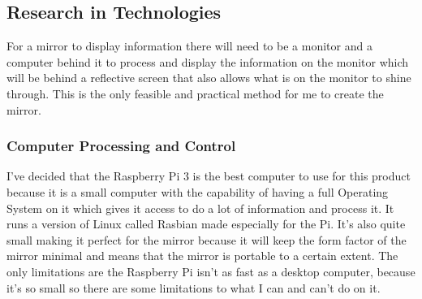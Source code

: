 \documentclass[12pt]{article}
\begin{document}
    \subsection{Research in Technologies}
        For a mirror to display information there will need to be a monitor and a computer behind it to process and display the information on the monitor which will be behind a reflective screen that also allows what is on the monitor to shine through. This is the only feasible and practical method for me to create the mirror. \\
        \subsubsection{Computer Processing and Control}
            \noindent I've decided that the Raspberry Pi 3 is the best computer to use for this product because it is a small computer with the capability of having a full Operating System on it which gives it access to do a lot of information and process it. It runs a version of Linux called Rasbian made especially for the Pi. It's also quite small making it perfect for the mirror because it will keep the form factor of the mirror minimal and means that the mirror is portable to a certain extent. The only limitations are the Raspberry Pi isn't as fast as a desktop computer, because it's so small so there are some limitations to what I can and can't do on it. \\
\end{document}
